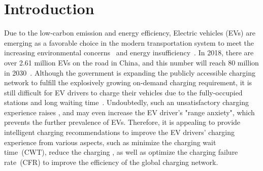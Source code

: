 \documentclass[sigconf]{acmart}
\newcommand{\hao}[1]{{\color{black}{#1}}}
\newcommand{\liu}[1]{{\color{black}{#1}}}
\newcommand{\jia}[1]{{\color{black}{#1}}}
\newcommand{\eg}{\emph{e.g.},\xspace}
\begin{document}
\maketitle

\section{Introduction}\label{sec:intro}

Due to the low-carbon emission and energy efficiency, Electric vehicles (EVs) are emerging as a favorable choice in the modern transportation system to meet the increasing environmental concerns~\liu{\cite{han2020joint}} and energy insufficiency~\cite{savari2020internet}.
In 2018, there are over 2.61 million EVs on the road in China, and this number will reach 80 million in 2030~\cite{zheng2020systematic}.
Although the government is expanding the publicly accessible charging network to fulfill the explosively growing on-demand charging requirement, it is still difficult for EV drivers to charge their vehicles due to the fully-occupied stations and long waiting time~\cite{wang2020faircharge,tian2016real,li2015growing,du2018demand}.
Undoubtedly, such an unsatisfactory charging experience raises \hao{undesirable charging cost and inefficiency}, and may even increase the EV driver's "range anxiety", which prevents the further prevalence of EVs.
Therefore, it is appealing to provide intelligent charging recommendations to improve the EV drivers' charging experience from various aspects, such as minimize the charging wait time~(CWT), reduce the charging \jia{price~(CP)}, as well as optimize the charging failure rate~(CFR) to improve the efficiency of the global charging network.
\end{document}

